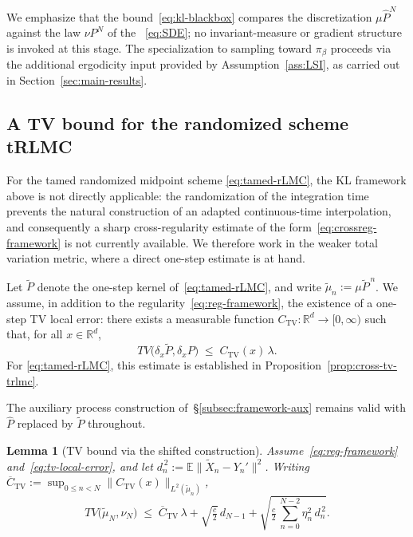 \documentclass[11pt,a4paper,reqno]{amsart}
\theoremstyle{plain}
\newtheorem{lemma}{Lemma}
\theoremstyle{definition}
\theoremstyle{remark}
\newcommand{\R}{\mathbb{R}}
\newcommand{\E}{\mathbb{E}}
\begin{document}
We emphasize that the bound~\eqref{eq:kl-blackbox} compares the discretization $\mu\widehat P^N$ against the law $\nu P^N$ of the ~\eqref{eq:SDE}; no invariant-measure or gradient structure is invoked at this stage. The specialization to sampling toward $\pi_\beta$ proceeds via the additional ergodicity input provided by Assumption~\ref{ass:LSI}, as carried out in Section~\ref{sec:main-results}.


\subsection{A TV bound for the randomized scheme tRLMC}
\label{subsec:framework-tv}

For the tamed randomized midpoint scheme \ref{eq:tamed-rLMC}, the KL
framework above is not directly applicable: the randomization of the
integration time prevents the natural construction of an adapted
continuous-time interpolation, and consequently a sharp cross-regularity
estimate of the form~\eqref{eq:crossreg-framework} is not currently
available. We therefore work in the weaker total variation metric,
where a direct one-step estimate is at hand.

Let $\widetilde P$ denote the one-step kernel
of~\ref{eq:tamed-rLMC}, and write
$\widetilde\mu_n:=\mu\widetilde P^{\,n}$. We assume, in addition to
the regularity~\eqref{eq:reg-framework}, the existence of a one-step
TV local error: there exists a measurable function
$C_{\mathrm{TV}}\colon\R^d\to[0,\infty)$ such that, for all $x\in\R^d$,
\begin{equation}\label{eq:tv-local-error}
  TV\!\bigl(\delta_x\widetilde P,\delta_x P\bigr)
  \;\le\;
  C_{\mathrm{TV}}(x)\,\lambda.
\end{equation}
For \ref{eq:tamed-rLMC}, this estimate is established in
Proposition~\ref{prop:cross-tv-trlmc}.

The auxiliary process construction of~\S\ref{subsec:framework-aux}
remains valid with $\widehat P$ replaced by $\widetilde P$ throughout.

\begin{lemma}[TV bound via the shifted construction]
\label{lem:tv-shifted}
Assume~\eqref{eq:reg-framework} and~\eqref{eq:tv-local-error}, and let
$d_n^{\,2}:=\E\|\widetilde X_n-Y_n'\|^{2}$. Writing
$\overline C_{\mathrm{TV}}:=\sup_{0\le n<N}\|C_{\mathrm{TV}}(x)\|_{L^2(\widetilde\mu_n)}$,
\begin{equation}\label{eq:tv-shifted-bound1}
  TV\!\bigl(\widetilde\mu_N,\nu_N\bigr)
  \;\le\;
  \overline C_{\mathrm{TV}}\,\lambda
  +\sqrt{\tfrac{c}{2}}\,d_{N-1}
  +\sqrt{\tfrac{c}{2}\,\sum_{n=0}^{N-2}\eta_n^{2}\,d_n^{\,2}}.
\end{equation}
\end{lemma}
\end{document}
